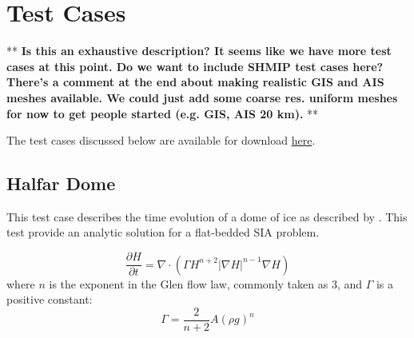 \chapter{Test Cases}
\label{chap:landice_test_cases}

** \textbf{Is this an exhaustive description? It seems like we have more test cases at this point. Do we want to include SHMIP test cases here? There's a comment at the end about making realistic GIS and AIS meshes available. We could just add some coarse res. uniform meshes for now to get people started (e.g. GIS, AIS 20 km).} **


The test cases discussed below are available for download \href{http://mpas-dev.github.io/land_ice/download.html}{here}.



\FloatBarrier


\section{Halfar Dome}
\label{sec:halfar_description}
This test case describes the time evolution of a dome of ice as described by \citet{Halfar1983}.
This test provide an analytic solution for a flat-bedded SIA problem.

\begin{equation}
    \label{halfar}
    \frac{\partial H}{\partial t} = \nabla \cdot (\Gamma H^{n+2} |\nabla H|^{n-1} \nabla H)
\end{equation}
where $n$ is the exponent in the Glen flow law, commonly taken as 3, and $\Gamma$ is a positive constant:
\begin{equation}
    \Gamma = \frac{2}{n+2} A (\rho g)^n
\end{equation}

